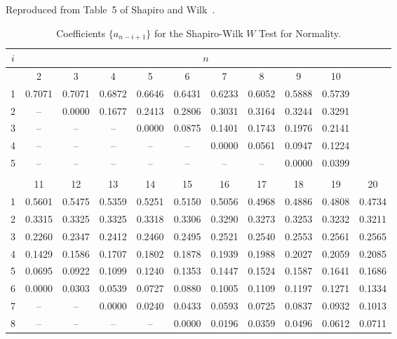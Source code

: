 \documentclass[draft]{article}
\begin{document}
\begin{table}
\caption{Coefficients \(\{a_{n-i+1}\}\) for the Shapiro-Wilk
\(W\) Test for Normality.}
\centerline{Reproduced from Table~5 of Shapiro and Wilk~\cite{shapiro65}.}
\label{tbl:shapiro-wilk-a}
\tiny
\begin{center}
\begin{tabular}{rcccccccccc}\hline
\multicolumn{1}{c}{\(i\)}  & \multicolumn{10}{c}{\(n\)} \\ \hline
  & \multicolumn{1}{c}{2} 
  & \multicolumn{1}{c}{3} 
  & \multicolumn{1}{c}{4} 
  & \multicolumn{1}{c}{5} 
  & \multicolumn{1}{c}{6} 
  & \multicolumn{1}{c}{7} 
  & \multicolumn{1}{c}{8} 
  & \multicolumn{1}{c}{9} 
  & \multicolumn{1}{c}{10} \\ \cline{2-10}
 1&0.7071&0.7071&0.6872&0.6646&0.6431&0.6233&0.6052&0.5888&0.5739\\
 2&    --&0.0000&0.1677&0.2413&0.2806&0.3031&0.3164&0.3244&0.3291\\
 3&    --&    --&   -- &0.0000&0.0875&0.1401&0.1743&0.1976&0.2141\\
 4&    --&    --&   -- &   -- &   -- &0.0000&0.0561&0.0947&0.1224\\
 5&    --&    --&   -- &   -- &   -- &   -- &   -- &0.0000&0.0399\\
\\
  & \multicolumn{1}{c}{11} 
  & \multicolumn{1}{c}{12} 
  & \multicolumn{1}{c}{13} 
  & \multicolumn{1}{c}{14} 
  & \multicolumn{1}{c}{15} 
  & \multicolumn{1}{c}{16} 
  & \multicolumn{1}{c}{17} 
  & \multicolumn{1}{c}{18} 
  & \multicolumn{1}{c}{19} 
  & \multicolumn{1}{c}{20} \\ \cline{2-11}
 1&0.5601&0.5475&0.5359&0.5251&0.5150&0.5056&0.4968&0.4886&0.4808&0.4734\\
 2&0.3315&0.3325&0.3325&0.3318&0.3306&0.3290&0.3273&0.3253&0.3232&0.3211\\
 3&0.2260&0.2347&0.2412&0.2460&0.2495&0.2521&0.2540&0.2553&0.2561&0.2565\\
 4&0.1429&0.1586&0.1707&0.1802&0.1878&0.1939&0.1988&0.2027&0.2059&0.2085\\
 5&0.0695&0.0922&0.1099&0.1240&0.1353&0.1447&0.1524&0.1587&0.1641&0.1686\\
 6&0.0000&0.0303&0.0539&0.0727&0.0880&0.1005&0.1109&0.1197&0.1271&0.1334\\
 7&   -- &   -- &0.0000&0.0240&0.0433&0.0593&0.0725&0.0837&0.0932&0.1013\\
 8&   -- &   -- &   -- &   -- &0.0000&0.0196&0.0359&0.0496&0.0612&0.0711\\

\end{tabular}
\end{center}
\end{table}
\end{document}
